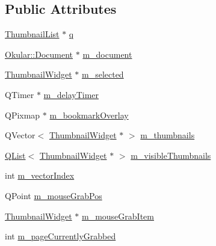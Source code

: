\subsection*{Public Attributes}
\begin{DoxyCompactItemize}
\item 
\hyperlink{classThumbnailList}{Thumbnail\+List} $\ast$ \hyperlink{classThumbnailListPrivate_ae2177fa339c619c575aa337d41465a4f}{q}
\item 
\hyperlink{classOkular_1_1Document}{Okular\+::\+Document} $\ast$ \hyperlink{classThumbnailListPrivate_ae19b3e09f87437e8d485d0e039a52b08}{m\+\_\+document}
\item 
\hyperlink{classThumbnailWidget}{Thumbnail\+Widget} $\ast$ \hyperlink{classThumbnailListPrivate_a0b16f6278cb8bd930d7b484affe31bac}{m\+\_\+selected}
\item 
Q\+Timer $\ast$ \hyperlink{classThumbnailListPrivate_a794d68d7044c33698b4b4db62d115702}{m\+\_\+delay\+Timer}
\item 
Q\+Pixmap $\ast$ \hyperlink{classThumbnailListPrivate_a87f8be2fdcdd496791316b4e4b87f007}{m\+\_\+bookmark\+Overlay}
\item 
Q\+Vector$<$ \hyperlink{classThumbnailWidget}{Thumbnail\+Widget} $\ast$ $>$ \hyperlink{classThumbnailListPrivate_adc3638d1cfe0435440c400065ccd20af}{m\+\_\+thumbnails}
\item 
\hyperlink{classQList}{Q\+List}$<$ \hyperlink{classThumbnailWidget}{Thumbnail\+Widget} $\ast$ $>$ \hyperlink{classThumbnailListPrivate_a7cbd0afea7a3fc032f23a1854cd7df52}{m\+\_\+visible\+Thumbnails}
\item 
int \hyperlink{classThumbnailListPrivate_a23212529d10b47411092e4ec45ffc2fe}{m\+\_\+vector\+Index}
\item 
Q\+Point \hyperlink{classThumbnailListPrivate_a0ee603709d00ac6ecfbf3298baabdd20}{m\+\_\+mouse\+Grab\+Pos}
\item 
\hyperlink{classThumbnailWidget}{Thumbnail\+Widget} $\ast$ \hyperlink{classThumbnailListPrivate_afd4652d135d2e87a4e10774e9cd73694}{m\+\_\+mouse\+Grab\+Item}
\item 
int \hyperlink{classThumbnailListPrivate_ae5c0eb0176feb0e7d25177d81ff2d483}{m\+\_\+page\+Currently\+Grabbed}
\end{DoxyCompactItemize}
